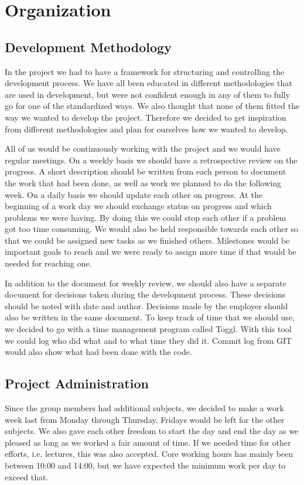 \section{Organization}
\label{sec:organization}

\subsection{Development Methodology}
\label{subsec:development_methodology}
In the project we had to have a framework for structuring and controlling the
development process. We have all been educated in different methodologies that
are used in development, but were not confident enough in any of them to fully
go for one of the standardized ways. We also thought that none of them fitted 
the way we wanted to develop the project. Therefore we decided to get inspiration
from different methodologies and plan for ourselves how we wanted to develop.

All of us would be continuously working with the project and we would have
regular meetings. On a weekly basis we should have a retrospective review on
the progress. A short description should be written from each person to
document the work that had been done, as well as work we planned to do the
following week. On a daily basis we should update each other on progress. At
the beginning of a work day we should exchange status on progress and which
problems we were having. By doing this we could stop each other if a problem
got too time consuming. We would also be held responsible towards each other so
that we could be assigned new tasks as we finished others. Milestones would be
important goals to reach and we were ready to assign more time if that
would be needed for reaching one.

In addition to the document for weekly review, we should also have a separate
document for decisions taken during the development process. These decisions
should be noted with date and author. Decisions made by the employer should
also be written in the same document. To keep track of time that we should use,
we decided to go with a time management program called Toggl. With this tool we
could log who did what and to what time they did it. Commit log from GIT would
also show what had been done with the code.


\subsection{Project Administration}
\label{subsec:project_administration}
Since the group members had additional subjects, we decided to make a work week
last from Monday through Thursday. Fridays would be left for the other
subjects. We also gave each other freedom to start the day and end the day as
we pleased as long as we worked a fair amount of time. If we needed time for
other efforts, i.e. lectures, this was also accepted. Core working hours has
mainly been between 10:00 and 14:00, but we have expected the minimum work per
day to exceed that.

